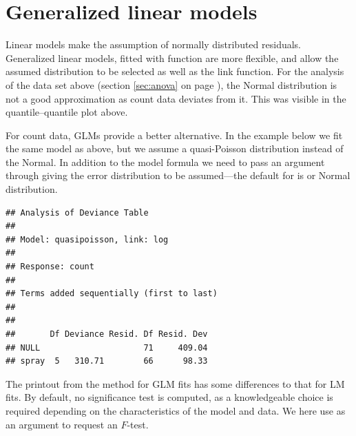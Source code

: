 \documentclass[krantz2]{krantz}\usepackage{knitr}
\begin{document}
\section{Generalized linear models}\label{sec:stat:GLM}

Linear models make the assumption of normally distributed residuals. Generalized linear models, fitted with function  are more flexible, and allow the assumed distribution to be selected as well as the link function.
For the analysis of the  data set above (section \ref{sec:anova} on page \pageref{sec:anova}), the Normal distribution is not a good approximation as count data deviates from it. This was visible in the quantile--quantile plot above.

For count data, GLMs provide a better alternative. In the example below we fit the same model as above, but we assume a quasi-Poisson distribution instead of the Normal. In addition to the model formula we need to pass an argument through  giving the error distribution to be assumed---the default for  is  or Normal distribution.

\begin{knitrout}\footnotesize
{}\color{fgcolor}\begin{kframe}
\begin{alltt}
 \hlkwb{<-}  \hlopt{~}     
\end{alltt}
\begin{verbatim}
## Analysis of Deviance Table
## 
## Model: quasipoisson, link: log
## 
## Response: count
## 
## Terms added sequentially (first to last)
## 
## 
##       Df Deviance Resid. Df Resid. Dev
## NULL                     71     409.04
## spray  5   310.71        66      98.33
\end{verbatim}
\end{kframe}
\end{knitrout}

The printout from the  method for GLM fits has some differences to that for LM fits. By default, no significance test is computed, as a knowledgeable choice is required depending on the characteristics of the model and data. We here use  as an argument to request an $F$-test.
\end{document}
